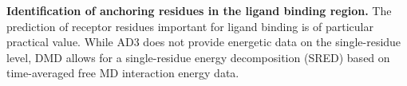

\vspace{1cm}
\textbf{Identification of anchoring residues in the ligand binding
region.} The prediction of receptor residues important for ligand binding is of
particular practical value. While AD3 does not provide energetic data on the
single-residue level, DMD allows for a single-residue energy decomposition
(SRED) based on time-averaged free MD interaction energy data.


